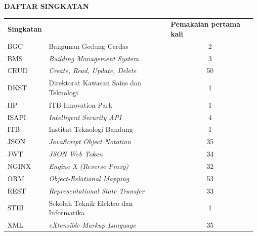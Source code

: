 \cleardoublepage
\vspace{2cm}
\begin{center}
{\fontsize{14}{16.8}\selectfont\textbf{DAFTAR SINGKATAN}}\\[1em]
\end{center}
\label{chap:singkatan}
\setcounter{chapter}{0}
\setcounter{section}{0}
\vspace{2em}

\begin{longtable}{@{} l >{\raggedright\arraybackslash}p{7.5cm} c @{}}
\multicolumn{1}{l}{\textbf{Singkatan}} & \multicolumn{1}{l}{\textbf{Deskripsi}} & \multicolumn{1}{l}{\parbox[c]{3.5cm}{\raggedright \textbf{Pemakaian pertama kali}}} \\


BGC & Bangunan Gedung Cerdas & 2 \\
BMS & \textit{Building Management System} & 3 \\
CRUD & \textit{Create, Read, Update, Delete} & 50 \\
DKST & Direktorat Kawasan Sains dan Teknologi & 1 \\
IIP & ITB Innovation Park & 1 \\
ISAPI & \textit{Intelligent Security API} & 4 \\
ITB & Institut Teknologi Bandung & 1 \\
JSON & \textit{JavaScript Object Notation} & 35 \\
JWT & \textit{JSON Web Token} & 34 \\
NGINX & \textit{Engine X (Reverse Proxy)} & 32 \\
ORM & \textit{Object-Relational Mapping} & 53 \\
REST & \textit{Representational State Transfer} & 33 \\
STEI & Sekolah Teknik Elektro dan Informatika & 1 \\
XML & \textit{eXtensible Markup Language} & 35 \\

\end{longtable}
